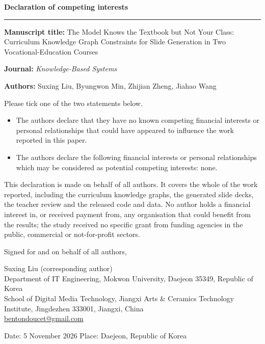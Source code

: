 \documentclass[11pt,a4paper]{article}
\newcommand{\ticked}{$\boxtimes$}
\newcommand{\unticked}{$\square$}
\begin{document}
{\Large\bfseries Declaration of competing interests}

\vspace{4pt}
\hrule
\vspace{10pt}

\textbf{Manuscript title:} The Model Knows the Textbook but Not Your Class:
Curriculum Knowledge Graph Constraints for Slide Generation in Two
Vocational-Education Courses

\textbf{Journal:} \emph{Knowledge-Based Systems}

\textbf{Authors:} Suxing Liu, Byungwon Min, Zhijian Zheng, Jiahao Wang

\vspace{6pt}
Please tick one of the two statements below.

\vspace{2pt}
\begin{itemize}
  \item[\ticked] The authors declare that they have no known competing financial
  interests or personal relationships that could have appeared to influence the
  work reported in this paper.

  \item[\unticked] The authors declare the following financial interests or
  personal relationships which may be considered as potential competing
  interests: none.
\end{itemize}

\vspace{6pt}
This declaration is made on behalf of all authors. It covers the whole of the
work reported, including the curriculum knowledge graphs, the generated slide
decks, the teacher review and the released code and data. No author holds a
financial interest in, or received payment from, any organisation that could
benefit from the results; the study received no specific grant from funding
agencies in the public, commercial or not-for-profit sectors.

\vspace{18pt}
Signed for and on behalf of all authors,

\vspace{22pt}
Suxing Liu \quad (corresponding author)\\
Department of IT Engineering, Mokwon University, Daejeon 35349, Republic of Korea\\
School of Digital Media Technology, Jiangxi Arts \& Ceramics Technology
Institute, Jingdezhen 333001, Jiangxi, China\\
\href{mailto:bentondoucet@gmail.com}{bentondoucet@gmail.com}

\vspace{8pt}
Date: 5 November 2026 \quad Place: Daejeon, Republic of Korea
\end{document}
